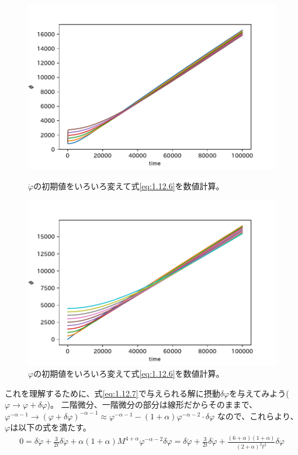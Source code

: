 \documentclass[11pt]{ltjsarticle}
\theoremstyle{plain}
\theoremstyle{break}
\begin{document}
\begin{figure}
  \centering
  \includegraphics{figure/cal_attracter_1.pdf}
  \caption{$\dot{\varphi}$の初期値をいろいろ変えて式\eqref{eq:1.12.6}を数値計算。}
  \label{fig:calculation_of_eq:1.12.6}
  \centering
  \includegraphics{figure/cal_attracter_2.pdf}
  \caption{$\varphi$の初期値をいろいろ変えて式\eqref{eq:1.12.6}を数値計算。}
  \label{fig:calculation_of_eq:1.12.6_log}
\end{figure}%
これを理解するために、式\eqref{eq:1.12.7}で与えられる解に摂動$\delta \varphi$を与えてみよう($\varphi \to \varphi +\delta \varphi$)。
二階微分、一階微分の部分は線形だからそのままで、$\varphi^{-\alpha -1}\to(\varphi + \delta \varphi)^{-\alpha-1}\approx \varphi^{-\alpha -1} -(1+\alpha)\varphi^{-\alpha-2} \cdot \delta \varphi$
なので、これらより、$\varphi$は以下の式を満たす。
\begin{align}
  0=\delta \ddot{\varphi}+\frac{3}{2 t} \delta \dot{\varphi}+\alpha(1+\alpha) M^{4+\alpha} \varphi^{-\alpha-2} \delta \varphi=\delta \ddot{\varphi}+\frac{3}{2 t} \delta \dot{\varphi}+\frac{(6+\alpha)(1+\alpha)}{(2+\alpha)^{2} t^{2}} \delta \varphi
\end{align}%
\end{document}
